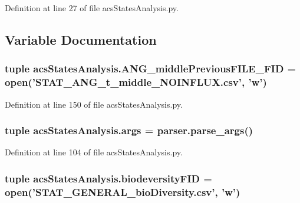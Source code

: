 Definition at line 27 of file acs\-States\-Analysis.\-py.



\subsection{Variable Documentation}
\hypertarget{a00099_aa5eb16eef2c90e2ccc991eb176280f21}{
\subsubsection[{A\-N\-G\-\_\-middle\-Previous\-F\-I\-L\-E\-\_\-\-F\-I\-D}]{\setlength{\rightskip}{0pt plus 5cm}tuple acs\-States\-Analysis.\-A\-N\-G\-\_\-middle\-Previous\-F\-I\-L\-E\-\_\-\-F\-I\-D = open('S\-T\-A\-T\-\_\-\-A\-N\-G\-\_\-t\-\_\-middle\-\_\-\-N\-O\-I\-N\-F\-L\-U\-X.\-csv', 'w')}}\label{a00099_aa5eb16eef2c90e2ccc991eb176280f21}


Definition at line 150 of file acs\-States\-Analysis.\-py.

\hypertarget{a00099_a4912a255d0be60fffea119e6bd92b6e4}{
\subsubsection[{args}]{\setlength{\rightskip}{0pt plus 5cm}tuple acs\-States\-Analysis.\-args = parser.\-parse\-\_\-args()}}\label{a00099_a4912a255d0be60fffea119e6bd92b6e4}


Definition at line 104 of file acs\-States\-Analysis.\-py.

\hypertarget{a00099_a68c23cb79e89d9e14acf9ed09f46f0e4}{
\subsubsection[{biodeversity\-F\-I\-D}]{\setlength{\rightskip}{0pt plus 5cm}tuple acs\-States\-Analysis.\-biodeversity\-F\-I\-D = open('S\-T\-A\-T\-\_\-\-G\-E\-N\-E\-R\-A\-L\-\_\-bio\-Diversity.\-csv', 'w')}}\label{a00099_a68c23cb79e89d9e14acf9ed09f46f0e4}


